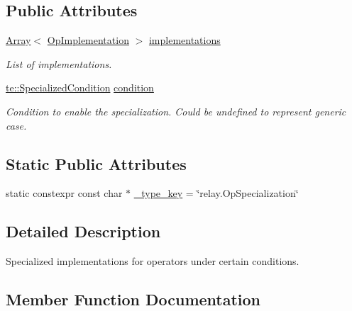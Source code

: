 \subsection*{Public Attributes}
\begin{DoxyCompactItemize}
\item 
\hyperlink{classtvm_1_1Array}{Array}$<$ \hyperlink{classtvm_1_1relay_1_1OpImplementation}{Op\+Implementation} $>$ \hyperlink{classtvm_1_1relay_1_1OpSpecializationNode_a8d5ffe97532ff7b663d2b7da09bd9042}{implementations}
\begin{DoxyCompactList}\small\item\em List of implementations. \end{DoxyCompactList}\item 
\hyperlink{classtvm_1_1te_1_1SpecializedCondition}{te\+::\+Specialized\+Condition} \hyperlink{classtvm_1_1relay_1_1OpSpecializationNode_ad5875014bf3e9ce9ffe49af09bebdb99}{condition}
\begin{DoxyCompactList}\small\item\em Condition to enable the specialization. Could be undefined to represent generic case. \end{DoxyCompactList}\end{DoxyCompactItemize}
\subsection*{Static Public Attributes}
\begin{DoxyCompactItemize}
\item 
static constexpr const char $\ast$ \hyperlink{classtvm_1_1relay_1_1OpSpecializationNode_afb3931d103169a872632a7bd949d0573}{\+\_\+type\+\_\+key} = \char`\"{}relay.\+Op\+Specialization\char`\"{}
\end{DoxyCompactItemize}


\subsection{Detailed Description}
Specialized implementations for operators under certain conditions. 

\subsection{Member Function Documentation}
